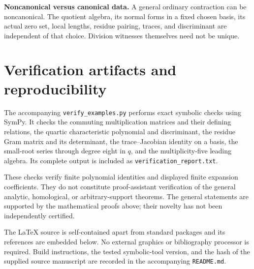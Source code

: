 \documentclass[11pt,letterpaper]{article}
\theoremstyle{definition}
\theoremstyle{remark}
\begin{document}
\noindent\textbf{Noncanonical versus canonical data.} A general ordinary contraction can be noncanonical. The quotient algebra, its normal forms in a fixed chosen basis, its actual zero set, local lengths, residue pairing, traces, and discriminant are independent of that choice. Division witnesses themselves need not be unique.

\section{Verification artifacts and reproducibility}
The accompanying \texttt{verify\_examples.py} performs exact symbolic checks using SymPy. It checks the commuting multiplication matrices and their defining relations, the quartic characteristic polynomial and discriminant, the residue Gram matrix and its determinant, the trace--Jacobian identity on a basis, the small-root series through degree eight in $q$, and the multiplicity-five leading algebra. Its complete output is included as \texttt{verification\_report.txt}.

These checks verify finite polynomial identities and displayed finite expansion coefficients. They do not constitute proof-assistant verification of the general analytic, homological, or arbitrary-support theorems. The general statements are supported by the mathematical proofs above; their novelty has not been independently certified.

The \LaTeX{} source is self-contained apart from standard packages and its references are embedded below. No external graphics or bibliography processor is required. Build instructions, the tested symbolic-tool version, and the hash of the supplied source manuscript are recorded in the accompanying \texttt{README.md}.
\end{document}
